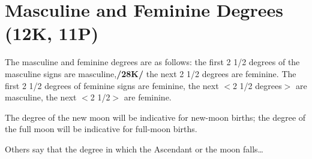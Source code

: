 \section{Masculine and Feminine Degrees (12K, 11P)}

The masculine and feminine degrees are as follows: the first 2 1/2 degrees of the masculine signs are masculine,\textbf{/28K/} the next 2 1/2 degrees are feminine. The first 2 1/2 degrees of feminine signs are feminine, the next $<$2 1/2 degrees$>$ are masculine, the next $<$2 1/2$>$ are feminine. 

\mndl[0.2cm]
The degree of the new moon will be indicative for new-moon births; the degree of the full moon will be indicative for full-moon births. 

Others say that the degree in which the Ascendant or the moon falls\ldots

\newpage